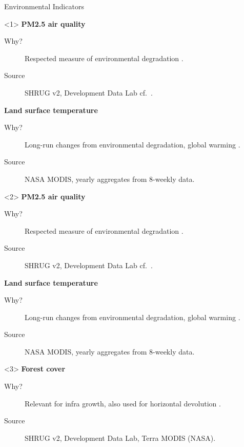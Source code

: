 \documentclass{beamer}
\begin{document}
    \begin{frame}{Environmental Indicators}
    \begin{onlyenv}<1>
        \textbf{PM2.5 air quality}
        \begin{description}
            \item[Why?] Respected measure of environmental degradation \parencite{caviglia2009}.
            \item[Source] SHRUG v2, Development Data Lab cf.~\textcite{donkelaar2021}.
        \end{description}
        \pause{}
        \textbf{Land surface temperature}
        \begin{description}
            \item[Why?] Long-run changes from environmental degradation, global warming \parencite{esa}.
            \item[Source] NASA MODIS, yearly aggregates from 8-weekly data.
        \end{description}
    \end{onlyenv}
    \begin{onlyenv}<2>
        \textbf{PM2.5 air quality}
        \begin{description}
            \item[Why?] Respected measure of environmental degradation \parencite{caviglia2009}.
            \item[Source] SHRUG v2, Development Data Lab cf.~\textcite{donkelaar2021}.
        \end{description}
        \textbf{Land surface temperature}
        \begin{description}
            \item[Why?] Long-run changes from environmental degradation, global warming \parencite{esa}.
            \item[Source] NASA MODIS, yearly aggregates from 8-weekly data.
        \end{description}
    \end{onlyenv}
    \begin{onlyenv}<3>
        \textbf{Forest cover}
        \begin{description}
            \item[Why?] Relevant for infra growth, also used for horizontal devolution \parencite{wang2003,finance2020}.
            \item[Source] SHRUG v2, Development Data Lab, Terra MODIS (NASA).
        \end{description}
    \end{onlyenv}
    \end{frame}
\end{document}
